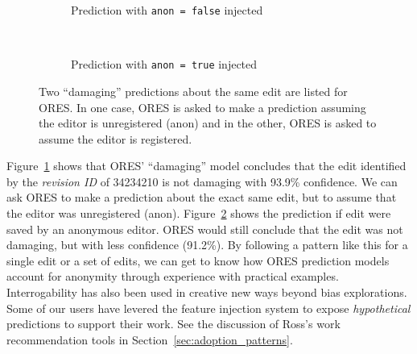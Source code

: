 \begin{figure*}[h]
\centering
\begin{subfigure}[t]{.5\textwidth}
  \caption{Prediction with \texttt{anon = false} injected}
  \label{fig:anon_injection_false}
\end{subfigure}~~
\begin{subfigure}[t]{.5\textwidth}
  \caption{Prediction with \texttt{anon = true} injected}
  \label{fig:anon_injection_true}
\end{subfigure}
\caption{Two ``damaging'' predictions about the same edit are listed for ORES.  In one case, ORES is asked to make a prediction assuming the editor is unregistered (anon) and in the other, ORES is asked to assume the editor is registered.}
\label{fig:anon_injection}
\end{figure*}

Figure~\ref{fig:anon_injection_false} shows that ORES' ``damaging'' model concludes that the edit identified by the \emph{revision ID} of 34234210 is not damaging with 93.9\% confidence.  We can ask ORES to make a prediction about the exact same edit, but to assume that the editor was unregistered (anon). Figure~\ref{fig:anon_injection_true} shows the prediction if edit were saved by an anonymous editor.  ORES would still conclude that the edit was not damaging, but with less confidence (91.2\%).  By following a pattern like this for a single edit or a set of edits, we can get to know how ORES prediction models account for anonymity through experience with practical examples. Interrogability has also been used in creative new ways beyond bias explorations.  Some of our users have levered the feature injection system to expose \emph{hypothetical} predictions to support their work.  See the discussion of Ross's work recommendation tools in Section~\ref{sec:adoption_patterns}.

